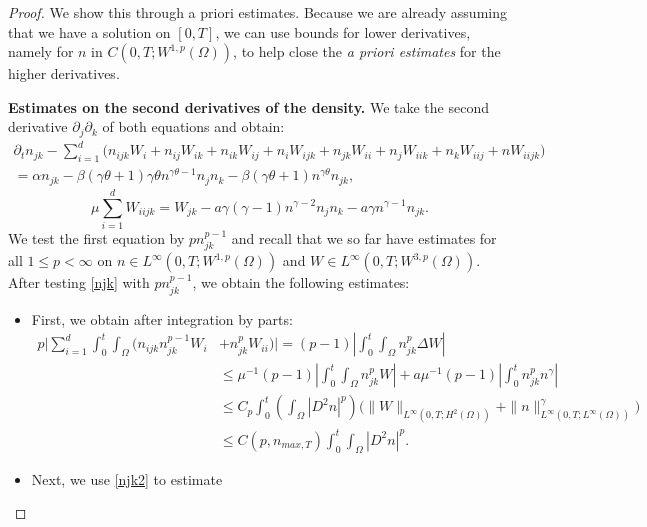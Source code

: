 \documentclass[12pt]{article}
\theoremstyle{plain}
\begin{document}
\begin{proof}

We show this through a priori estimates. Because we are already assuming that we have a solution on $[0, T]$, we can use bounds for lower derivatives, namely for $n$ in $C(0, T; W^{1, p}(\Omega))$, to help close the \textit{a priori estimates} for the higher derivatives.

\medskip

\noindent \textbf{Estimates on the second derivatives of the density.} We take the second derivative $\partial_{j} \partial_{k}$ of both equations and obtain:
\begin{multline}\label{njk}
\partial_{t} n_{jk} - \sum_{i = 1}^{d} \Big(n_{ijk}W_{i} + n_{ij}W_{ik} + n_{ik}W_{ij} + n_{i}W_{ijk} + n_{jk}W_{ii} + n_{j}W_{iik} + n_{k}W_{iij} + nW_{iijk}\Big) \\
= \alpha n_{jk} - \beta(\gamma \theta + 1) \gamma \theta n^{\gamma \theta - 1} n_{j}n_{k} - \beta(\gamma \theta + 1) n^{\gamma \theta} n_{jk},
\end{multline}
\begin{equation}\label{njk2}
\mu \sum_{i = 1}^{d} W_{iijk} = W_{jk} - a\gamma(\gamma - 1)n^{\gamma - 2} n_{j}n_{k} - a\gamma n^{\gamma - 1} n_{jk}.
\end{equation}
We test the first equation by $p n_{jk}^{p - 1}$ and recall that we so far have estimates for all $1 \le p < \infty$ on $n \in L^{\infty}(0, T; W^{1, p}(\Omega))$ and $W \in L^{\infty}(0, T; W^{3, p}(\Omega))$. After testing \eqref{njk} with $p n_{jk}^{p - 1}$, we obtain the following estimates:
\begin{itemize}
    \item First, we obtain after integration by parts:
    \begin{align*}
    p\Big|\sum_{i = 1}^{d} \int_{0}^{t} \int_{\Omega} \Big(n_{ijk}n_{jk}^{p - 1}W_{i} &+ n_{jk}^{p}W_{ii}\Big)\Big| = (p - 1) \left|\int_{0}^{t} \int_{\Omega} n_{jk}^{p} \Delta W\right| \\
    &\le \mu^{-1}(p - 1) \left|\int_{0}^{t} \int_{\Omega} n_{jk}^{p}W\right| + a\mu^{-1}(p - 1) \left|\int_{0}^{t} n_{jk}^{p}n^{\gamma}\right| \\
    &\le C_{p}\int_{0}^{t} \left(\int_{\Omega} |D^{2}n|^{p}\right) \Big(\|W\|_{L^{\infty}(0, T; H^{2}(\Omega))} + \|n\|_{L^{\infty}(0, T; L^{\infty}(\Omega))}^{\gamma}\Big) \\
    &\le C(p, n_{max, T}) \int_{0}^{t} \int_{\Omega} |D^{2}n|^{p}.
    \end{align*}
    \item Next, we use \eqref{njk2} to estimate

\end{itemize}
\end{proof}
\end{document}
